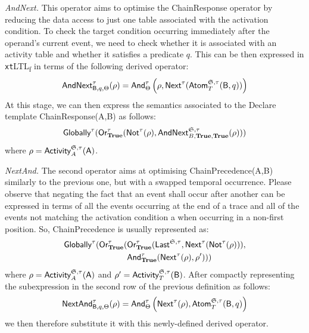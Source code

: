 \documentclass[sigconf]{acmart}
\begin{document}
\textit{AndNext.} This operator aims to optimise the \textsf{ChainResponse} operator by reducing the data access to just one table associated with the activation condition. To check the target condition occurring immediately after the operand's current event, we need to check whether it is associated with an activity table and whether it satisfies a predicate $q$. This can be then expressed in \texttt{xt}LTL\textsubscript{f} in terms of the following derived operator:
\begin{equation}\label{eq:andNext}
\textsf{AndNext}^\tau_{\textsf{B},q,\Theta}(\rho)=\textsf{And}^\tau_\Theta\left(\rho,\textsf{Next}^\tau(\textsf{Atom}^{\mathfrak{S},\tau}_{T}(\textsf{B},q))\right)
\end{equation}
At this stage, we can then express the semantics associated to the Declare template \textsf{ChainResponse(A,B)} as follows:
\[\textsf{Globally}^\tau(\textsf{Or}^\tau_\textbf{True}(\textsf{Not}^\tau(\rho),\textsf{AndNext}^{\mathfrak{S},\tau}_{B,\textbf{True},\textbf{True}}(\rho)))\]
where $\rho=\textsf{Activity}^{\mathfrak{S},\tau}_A(\textsf{A})$.
\medskip


\textit{NextAnd.} The second operator aims at optimising \textsf{ChainPrecedence(A,B)} similarly to the previous one, but with a swapped temporal occurrence. Please observe that negating the fact that an event shall occur after another can be expressed in terms of all the events occurring at the end of a trace and all of the events not matching the activation condition a when occurring in a non-first position. So, ChainPrecedence is usually represented as:
\[\begin{split}
\textsf{Globally}^\tau(\textsf{Or}^\tau_\textbf{True}(&\textsf{Or}^\tau_\textbf{True}(\textsf{Last}^{\mathfrak{S},\tau},\textsf{Next}^\tau(\textsf{Not}^\tau(\rho))), \\
&\textsf{And}^\tau_\textbf{True}(\textsf{Next}^\tau(\rho),\rho')))
\end{split}\]
where $\rho=\textsf{Activity}^{\mathfrak{S},\tau}_A(\textsf{A})$ and $\rho'=\textsf{Activity}^{\mathfrak{S},\tau}_T(\textsf{B})$. After compactly representing the subexpression in the second row of the previous definition as follows:
\begin{equation}\label{lastEQ}
\textsf{NextAnd}^\tau_{\textsf{B},q,\Theta}(\rho)=\textsf{And}^\tau_\Theta\left(\textsf{Next}^\tau(\rho),\textsf{Atom}^{\mathfrak{S},\tau}_{T}(\textsf{B},q)\right)
\end{equation}
 we then therefore substitute it with this newly-defined derived operator.\medskip
\end{document}
